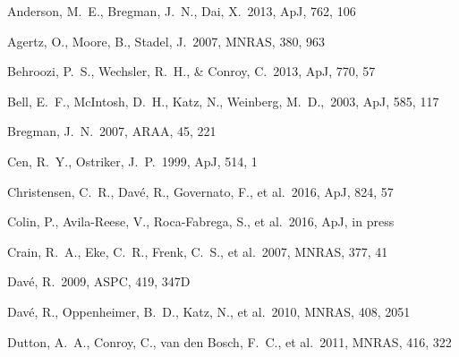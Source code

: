 \documentclass[useAMS,usenatbib]{mn2e}
\def \apj {ApJ}
\def \mnras {MNRAS}
\begin{document}
\begin{thebibliography}{}


 Anderson, M.~E., Bregman, J.~N., Dai, X.\ 2013, \apj, 762, 106

 Agertz, O., Moore, B., Stadel, J.\ 2007, \mnras, 380, 963


 Behroozi, P.~S.,
  Wechsler, R.~H., \& Conroy, C.\ 2013, \apj, 770, 57

 Bell, E.~F., McIntosh, D.~H., Katz, N., Weinberg, M.~D.,\ 2003, \apj, 585, 117

Bregman, J.~N.\ 2007, ARAA, 45, 221


Cen, R.~Y., Ostriker, J.~P.\ 1999, \apj, 514, 1

Christensen, C.~R., Dav{\'e}, R., Governato, F., et al.\ 2016, \apj, 824, 57

Colin, P., Avila-Reese, V., Roca-Fabrega, S., et al.\ 2016, \apj, in press

Crain, R.~A., Eke, C.~R., Frenk, C.~S., et al.\ 2007, \mnras, 377, 41


 Dav{\'e}, R.\ 2009, ASPC, 419, 347D

 Dav{\'e}, R., Oppenheimer, B.~D., Katz, N., et al.\ 2010, \mnras, 408, 2051

 Dutton, A.~A., Conroy, 
  C., van den Bosch, F.~C., et al.\ 2011, \mnras, 416, 322
  

\end{thebibliography}
\end{document}

